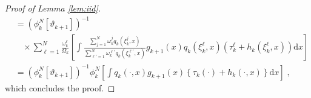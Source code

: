 \documentclass[12pt]{article}
\newcommand{\rmd}{\mathrm{d}}
\newcommand{\eqsp}{\;}
\newcommand{\1}{\mathrm{1}}
\newcommand{\qk}{q_{k}}
\begin{document}
\begin{proof}[Proof of Lemma \ref{lem:iid}]
\begin{align*}
&= \left(\phi^N_{k}[\vartheta_{k+1}]\right)^{-1}\\
&~~~~\times\sum_{\ell=1}^N \frac{\omega_k^\ell}{\Omega_k}\left[\int \frac{ \sum_{j=1}^N \omega_k^j\qk(\xi_k^j,x) }{ \sum_{\ell'=1}^N\omega_k^{\ell'}\qk(\xi_{k}^{\ell'},x) } g_{k+1}(x)\qk (\xi_{k}^{\ell},x)\left(\tau^{\ell}_k + h_{k}(\xi_{k}^{\ell},x)\right) \rmd x \right]\\ 
& =\left(\phi^N_{k}[\vartheta_{k+1}]\right)^{-1}\phi^N_{k}\left[\int \qk(\cdot,x)g_{k+1}(x)\left\{\tau_k(\cdot) + h_{k}(\cdot,x)\right\}\rmd x\right]\eqsp,
\end{align*}
which concludes the proof.
\end{proof}

\end{document}
